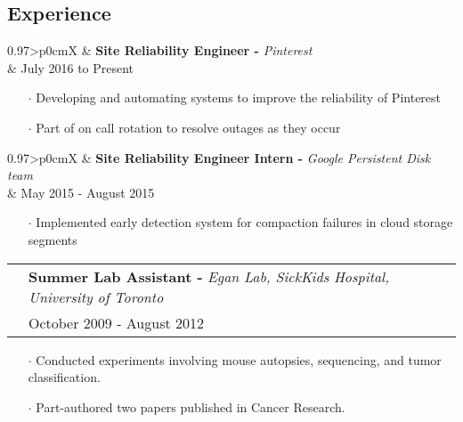 \documentclass[letterpaper, oneside, final]{scrartcl} %
\newcommand{\gray}{\rowcolor[gray]{.90}} %
\begin{document}
\begin{center}

\vspace{-0.5cm}

\section{Experience}

\renewcommand{\arraystretch}{1.3}

\begin{tabularx}{0.97\linewidth}{>{\raggedleft\scshape}p{0cm}X}
\gray & \textbf{Site Reliability Engineer -} \textit{Pinterest}\\
\gray & {July 2016 to Present}\\
\end{tabularx}
\vspace{-0.1cm}
\begin{itemize} \itemsep-0.2cm
\item[$\cdot$] Developing and automating systems to improve the reliability of Pinterest\\
\item[$\cdot$] Part of on call rotation to resolve outages as they occur\\
\end{itemize}

\begin{tabularx}{0.97\linewidth}{>{\raggedleft\scshape}p{0cm}X}
\gray & \textbf{Site Reliability Engineer Intern -} \textit{Google Persistent Disk team}\\
\gray & {May 2015 - August 2015}\\
\end{tabularx}
\vspace{-0.1cm}
\begin{itemize} \itemsep-0.2cm
\item[$\cdot$] Implemented early detection system for compaction failures in cloud storage segments\\
\end{itemize}

\begin{tabularx}{0.97\linewidth}{>{\raggedleft\scshape}p{0cm}X}
\gray & \textbf{Summer Lab Assistant -} \textit{Egan Lab, SickKids Hospital, University of Toronto}\\
\gray & {October 2009 - August 2012}\\
\end{tabularx}
\vspace{-0.1cm}
\begin{itemize} \itemsep-0.2cm
\item[$\cdot$] Conducted experiments involving mouse autopsies, sequencing, and tumor classification.
\item[$\cdot$] Part-authored two papers published in Cancer Research.\\
\end{itemize}


\end{center}
\end{document}
